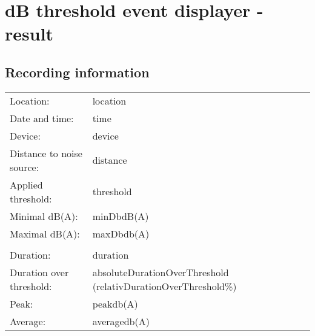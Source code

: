 \documentclass{article}
\begin{document}
\thispagestyle{empty}

\section*{dB threshold event displayer - result}

\subsection*{Recording information}

\begin{table}[h!]
    \begin{tabular}{p{4cm} p{4cm}}
        Location:                   & {{location}}      \\
        Date and time:              & {{time}}          \\
        Device:                     & {{device}}        \\
        Distance to noise source:   & {{distance}}      \\
        Applied threshold:          & {{threshold}}     \\
        Minimal dB(A):              & {{minDb}}dB(A)    \\
        Maximal dB(A):              & {{maxDb}}db(A)    \\
                                                        \\
        Duration:                   & {{duration}}      \\
        Duration over threshold:    & {{absoluteDurationOverThreshold}} ({{relativDurationOverThreshold}}\%) \\
        Peak:                       & {{peak}}db(A)  \\
        Average:                    & {{average}}db(A)  \\
    \end{tabular}
    \label{tab:table}
\end{table}

\begin{figure}[h!]
    \begin{center}
    \end{center}
    \label{fig:filtered-audio-values}
\end{figure}
\end{document}

